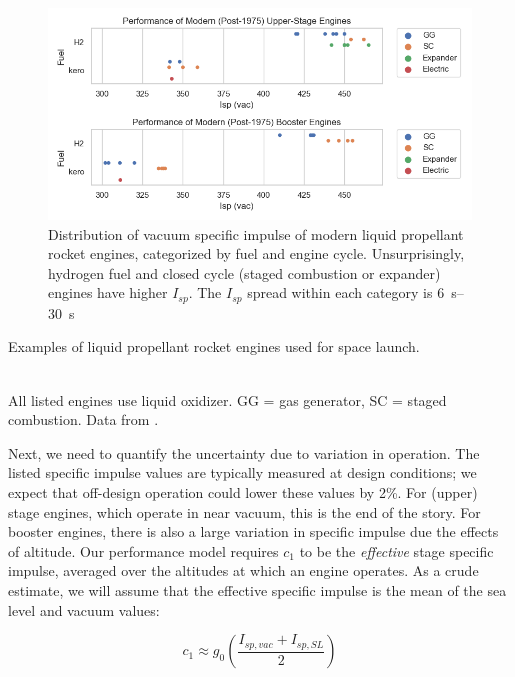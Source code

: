 \documentclass[conf]{../new-aiaa}
\begin{document}
\begin{figure}[hbt!]
    \centering
    \includegraphics[width=1\textwidth]{engine_trends/engine_isp_dist}
    \caption{\label{fig:engine_isp_dist} Distribution of vacuum specific impulse of modern liquid propellant rocket engines, categorized by fuel and engine cycle. Unsurprisingly, hydrogen fuel and closed cycle (staged combustion or expander) engines have higher $I_{sp}$. The $I_{sp}$ spread within each category is \SIrange{6}{30}{\second}}
\end{figure}

\begin{table}
    \caption{\label{tab:engine_historical_trends} Examples of liquid propellant rocket engines used for space launch.}
    \centering
    \small
    
    \\
    All listed engines use liquid  oxidizer. GG = gas generator, SC = staged combustion. Data from \cite{hist_lpre,wiki:OrbitalEngines, Falcon9}.
\end{table}

Next, we need to quantify the uncertainty due to variation in operation. The listed specific impulse values are typically measured at design conditions; we expect that off-design operation could lower these values by 2\%. For  (upper) stage engines, which operate in near vacuum, this is the end of the story. For booster engines, there is also a large variation in specific impulse due the effects of altitude. Our performance model requires $c_1$ to be the \emph{effective}  stage specific impulse, averaged over the altitudes at which an engine operates. As a crude estimate, we will assume that the effective specific impulse is the mean of the sea level and vacuum values:

\[
    c_1 \approx g_0 \left( \frac{I_{sp, vac} + I_{sp, SL}}{2} \right)
\]
\end{document}

